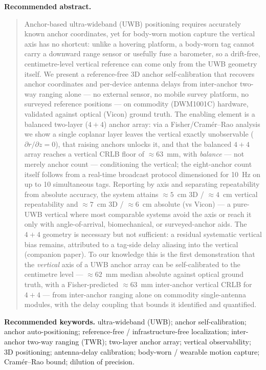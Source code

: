 \documentclass[11pt,a4paper]{article}
\begin{document}
\textbf{Recommended abstract.}
\begin{quote}\small
Anchor-based ultra-wideband (UWB) positioning requires accurately known anchor coordinates, yet for
body-worn motion capture the vertical axis has no shortcut: unlike a hovering platform, a body-worn
tag cannot carry a downward range sensor or usefully fuse a barometer, so a drift-free,
centimetre-level vertical reference can come only from the UWB geometry itself. We present a
reference-free 3D anchor self-calibration that recovers anchor coordinates and per-device antenna
delays from inter-anchor two-way ranging alone --- no external sensor, no mobile survey platform, no
surveyed reference positions --- on commodity (DWM1001C) hardware, validated against optical (Vicon)
ground truth. The enabling element is a balanced two-layer ($4{+}4$) anchor array: via a
Fisher/Cram\'{e}r--Rao analysis we show a single coplanar layer leaves the vertical exactly
unobservable ($\partial r/\partial z = 0$), that raising anchors unlocks it, and that the balanced
$4{+}4$ array reaches a vertical CRLB floor of ${\approx}63$~mm, with \emph{balance} --- not merely
anchor count --- conditioning the vertical; the eight-anchor count itself follows from a real-time
broadcast protocol dimensioned for 10~Hz on up to 10 simultaneous tags. Reporting by axis and
separating repeatability from absolute accuracy, the system attains ${\approx}5$~cm 3D / ${\approx}4$~cm
vertical repeatability and ${\approx}7$~cm 3D / ${\approx}6$~cm absolute (vs Vicon) --- a pure-UWB
vertical where most comparable systems avoid the axis or reach it only with angle-of-arrival,
biomechanical, or surveyed-anchor aids. The $4{+}4$ geometry is necessary but not sufficient: a residual systematic vertical
bias remains, attributed to a tag-side delay aliasing into the vertical (companion paper). To our knowledge this is
the first demonstration that the \emph{vertical} axis of a UWB anchor array can be self-calibrated to
the centimetre level --- ${\approx}62$~mm median absolute against optical ground truth, with a Fisher-predicted ${\approx}63$~mm
inter-anchor vertical CRLB for $4{+}4$ --- from inter-anchor ranging alone on commodity single-antenna
modules, with the delay coupling that bounds it identified and quantified.
\end{quote}

\textbf{Recommended keywords.} ultra-wideband (UWB); anchor self-calibration; anchor auto-positioning;
reference-free / infrastructure-free localization; inter-anchor two-way ranging (TWR); two-layer
anchor array; vertical observability; 3D positioning; antenna-delay calibration; body-worn / wearable
motion capture; Cram\'{e}r--Rao bound; dilution of precision.
\end{document}
